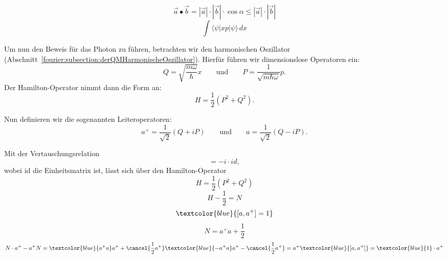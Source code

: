 \begin{equation}
	\vec{a}\bullet\vec{b} = |\vec{a}| \cdot |\vec{b}| \cdot \cos{\alpha} \leq |\vec{a}| \cdot |\vec{b}|
\end{equation}
\begin{equation}
	\int \langle \psi |xp|\psi \rangle\,dx	%
\end{equation}

Um nun den Beweis für das Photon zu führen, betrachten wir den harmonischen Oszillator (Abschnitt~\ref{fourier:subsection:derQMHarmonischeOszillator}).
Hierfür führen wir dimensionslose Operatoren ein:
\[ 
Q = \sqrt{\frac{m\omega}{\hbar}}x
\qquad\text{und}\qquad
P = \frac{1}{\sqrt{m\hbar\omega}}p.
\]
Der Hamilton-Operator nimmt dann die Form an:
\begin{equation}
	H = \frac{1}{2}(P^2 + Q^2).
\end{equation}

Nun definieren wir die sogenannten Leiteroperatoren:
\[
a^{+} = \frac{1}{\sqrt{2}}(Q + iP)
\qquad\text{und}\qquad
a = \frac{1}{\sqrt{2}}(Q - iP).
\]

Mit der Vertauschungsrelation
\begin{equation}
	[P,Q] = -i \cdot id,
\end{equation}
wobei id die Einheitsmatrix ist, lässt sich über den Hamilton-Operator %
\begin{equation}
	H = \frac{1}{2}(P^2+Q^2)
\end{equation}
\begin{equation}
	H - \frac{1}{2} = N
\end{equation}
\begin{equation}
	\textcolor{blue}{[a, a^+] = 1}
\end{equation}
\begin{equation}
	N = a^+a + \frac{1}{2}
\end{equation}
\begin{equation}
	N\cdot a^+ - a^+N 
	= \textcolor{blue}{a^+a}a^+ + \cancel{\frac{1}{2}a^+} \textcolor{blue}{-a^+a}a^+ - \cancel{\frac{1}{2}a^+}
	= a^+\textcolor{blue}{[a, a^+]}
	= \textcolor{blue}{1}\cdot a^+
\end{equation}

